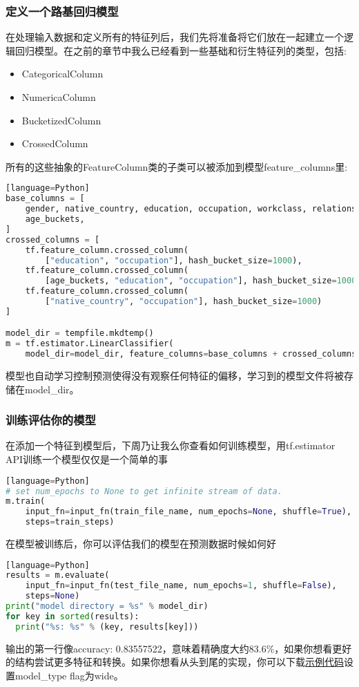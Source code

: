 \subsubsection{定义一个路基回归模型}
在处理输入数据和定义所有的特征列后，我们先将准备将它们放在一起建立一个逻辑回归模型。在之前的章节中我么已经看到一些基础和衍生特征列的类型，包括:
\begin{itemize}
  \item CategoricalColumn
  \item NumericaColumn
  \item BucketizedColumn
  \item CrossedColumn
\end{itemize}
所有的这些抽象的FeatureColumn类的子类可以被添加到模型feature\_columns里:
\begin{lstlisting}[language=Python][language=Python]
base_columns = [
    gender, native_country, education, occupation, workclass, relationship,
    age_buckets,
]
crossed_columns = [
    tf.feature_column.crossed_column(
        ["education", "occupation"], hash_bucket_size=1000),
    tf.feature_column.crossed_column(
        [age_buckets, "education", "occupation"], hash_bucket_size=1000),
    tf.feature_column.crossed_column(
        ["native_country", "occupation"], hash_bucket_size=1000)
]

model_dir = tempfile.mkdtemp()
m = tf.estimator.LinearClassifier(
    model_dir=model_dir, feature_columns=base_columns + crossed_columns)
\end{lstlisting}
模型也自动学习控制预测使得没有观察任何特征的偏移，学习到的模型文件将被存储在model\_dir。
\subsubsection{训练评估你的模型}
在添加一个特征到模型后，下周乃让我么你查看如何训练模型，用tf.estimator API训练一个模型仅仅是一个简单的事
\begin{lstlisting}[language=Python][language=Python]
# set num_epochs to None to get infinite stream of data.
m.train(
    input_fn=input_fn(train_file_name, num_epochs=None, shuffle=True),
    steps=train_steps)
\end{lstlisting}
在模型被训练后，你可以评估我们的模型在预测数据时候如何好
\begin{lstlisting}[language=Python][language=Python]
results = m.evaluate(
    input_fn=input_fn(test_file_name, num_epochs=1, shuffle=False),
    steps=None)
print("model directory = %s" % model_dir)
for key in sorted(results):
  print("%s: %s" % (key, results[key]))
\end{lstlisting}
输出的第一行像accuracy: 0.83557522，意味着精确度大约83.6\%，如果你想看更好的结构尝试更多特征和转换。如果你想看从头到尾的实现，你可以下载\href{https://www.github.com/tensorflow/tensorflow/blob/r1.3/tensorflow/examples/learn/wide_n_deep_tutorial.py}{示例代码}设置model\_type flag为wide。
